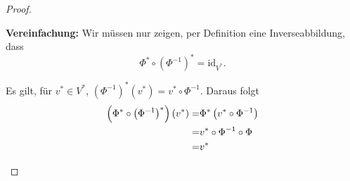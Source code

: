 \begin{proof}
\begin{parts}
		\begin{tcolorbox}
			\textbf{Vereinfachung:} Wir müssen nur zeigen, per Definition eine Inverseabbildung, dass
			\[
				\Phi^*\circ \left( \Phi^{-1} \right) ^*=\text{id}_{V^*}
			.\] 
		\end{tcolorbox}
		Es gilt, f\"{u}r $v^*\in V^*$, $\left( \Phi^{-1} \right)^*(v^*)=v^*\circ\Phi^{-1}$. Daraus folgt
		\begin{align*}
			\left(\Phi^*\circ\left( \Phi^{-1} \right)^*\right)(v^*)=&\Phi^*\left( v^*\circ \Phi^{-1} \right) \\
			=& v^*\circ\Phi^{-1}\circ\Phi\\
			=& v^*\qedhere
		\end{align*}
	\end{parts}
\end{proof}
